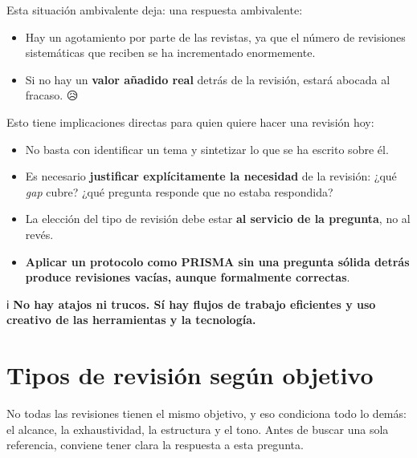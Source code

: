 \documentclass[
]{book}
\providecommand{\tightlist}{%
  \setlength{\itemsep}{0pt}\setlength{\parskip}{0pt}}
\begin{document}
Esta situación ambivalente deja: una respuesta ambivalente:

\begin{itemize}
\item
  Hay un agotamiento por parte de las revistas, ya que el número de revisiones sistemáticas que reciben se ha incrementado enormemente.
\item
  Si no hay un \textbf{valor añadido real} detrás de la revisión, estará abocada al fracaso. 😥
\end{itemize}

Esto tiene implicaciones directas para quien quiere hacer una revisión hoy:

\begin{itemize}
\tightlist
\item
  No basta con identificar un tema y sintetizar lo que se ha escrito sobre él.
\item
  Es necesario \textbf{justificar explícitamente la necesidad} de la revisión: ¿qué \emph{gap} cubre? ¿qué pregunta responde que no estaba respondida?
\item
  La elección del tipo de revisión debe estar \textbf{al servicio de la pregunta}, no al revés.
\item
  \textbf{Aplicar un protocolo como PRISMA sin una pregunta sólida detrás produce revisiones vacías, aunque formalmente correctas}.
\end{itemize}

ℹ️ \textbf{No hay atajos ni trucos. Sí hay flujos de trabajo eficientes y uso creativo de las herramientas y la tecnología.}

\section{Tipos de revisión según objetivo}\label{tipos-de-revisiuxf3n-seguxfan-objetivo}

No todas las revisiones tienen el mismo objetivo, y eso condiciona todo lo demás: el alcance, la exhaustividad, la estructura y el tono. Antes de buscar una sola referencia, conviene tener clara la respuesta a esta pregunta.
\end{document}
